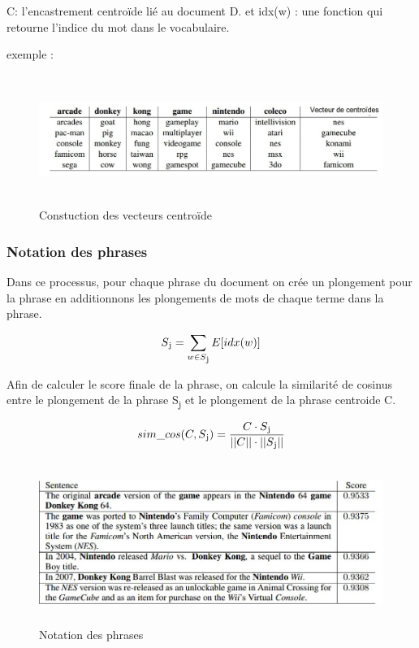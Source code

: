              C: l'encastrement centroïde lié au document D.
             et 
             idx(w) : une fonction qui retourne l'indice du mot dans le vocabulaire.
             
             exemple :
             
             \begin{figure}[H]
                \centering
                \includegraphics[height=120pt,width=380pt]{img/chapter3/centroideembed.jpg}
                \caption{Constuction des vecteurs centroïde}
                \label{Constuction des vecteurs centroïde}
             \end{figure}

         \subsubsection{Notation des phrases}
         Dans ce processus, pour chaque phrase du document on crée un plongement pour la phrase en additionnons les plongements de mots de chaque terme dans la phrase.

        \begin{equation*}
         S\textsubscript{j} = \sum_{\substack{w\in S\textsubscript{j}}}
         E[idx(w)]
        \end{equation*}

        Afin de calculer le score finale de la phrase, on calcule la similarité de cosinus entre le plongement de la phrase S\textsubscript{j} et le plongement de la phrase centroide C.
        
        \[sim\_cos(C,S\textsubscript{j}) = \frac {C \cdot S\textsubscript{j}}{||C|| \cdot ||S\textsubscript{j}||}\]
                    
                    \begin{figure}[H]
                        \centering
                        \includegraphics[height=150pt,width=380pt]{img/chapter3/scoreembed.jpg}
                        \caption{Notation des phrases}
                        \label{Notation des phrases}
                    \end{figure}

